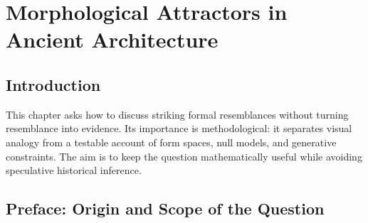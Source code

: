 \chapter{Morphological Attractors in Ancient Architecture}

\begingroup


\def\dist{\operatorname{dist}}

\def\Prob{\operatorname{Pr}}

\def\argmin{\operatorname{arg\,min}}

\begin{abstract}
This article proposes a mathematical framework for studying apparent overlaps between ancient architectural forms and modern formal representations of biological, physical, mathematical, or computational structures. The aim is not to support non-mainstream archaeological claims, nor to infer hidden knowledge from visual resemblance. Instead, the paper formulates a conservative research program: ancient artifacts, ornaments, plans, columns, cavities, and architectural complexes may be studied as endpoints of constrained generative processes. Some resulting shape classes may be common because they are large-basin attractors in a space of possible forms; others may be rare and therefore useful for identifying hidden craft constraints, technological procedures, or limitations in our null models. The proposed framework combines dynamical systems, shape grammars, topology, graph theory, metric geometry, symmetry analysis, and empirical simulation.
\end{abstract}

\section{Introduction}

This chapter asks how to discuss striking formal resemblances without turning
resemblance into evidence. Its importance is methodological: it separates
visual analogy from a testable account of form spaces, null models, and
generative constraints. The aim is to keep the question mathematically useful
while avoiding speculative historical inference.

\section*{Preface: Origin and Scope of the Question}

